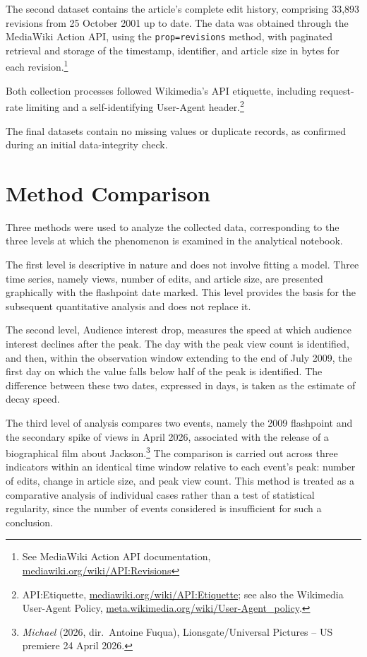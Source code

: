 \documentclass[11pt]{article}
\begin{document}
The second dataset contains the article's complete edit history, comprising 33{,}893 revisions from 25 October 2001 up to date. The data was obtained through the MediaWiki Action API, using the \texttt{prop=revisions} method, with paginated retrieval and storage of the timestamp, identifier, and article size in bytes for each revision.\footnote{See MediaWiki Action API documentation, \url{mediawiki.org/wiki/API:Revisions}}

Both collection processes followed Wikimedia's API etiquette, including request-rate limiting and a self-identifying User-Agent header.\footnote{API:Etiquette, \url{mediawiki.org/wiki/API:Etiquette}; see also the Wikimedia User-Agent Policy, \url{meta.wikimedia.org/wiki/User-Agent_policy}.}

The final datasets contain no missing values or duplicate records, as confirmed during an initial data-integrity check.


\section*{Method Comparison}

Three methods were used to analyze the collected data, corresponding to the three levels at which the phenomenon is examined in the analytical notebook.

The first level is descriptive in nature and does not involve fitting a model. Three time series, namely views, number of edits, and article size, are presented graphically with the flashpoint date marked. This level provides the basis for the subsequent quantitative analysis and does not replace it.

The second level, Audience interest drop, measures the speed at which audience interest declines after the peak. The day with the peak view count is identified, and then, within the observation window extending to the end of July 2009, the first day on which the value falls below half of the peak is identified. The difference between these two dates, expressed in days, is taken as the estimate of decay speed.

The third level of analysis compares two events, namely the 2009 flashpoint and the secondary spike of views in April 2026, associated with the release of a biographical film about Jackson.\footnote{\textit{Michael} (2026, dir.\ Antoine Fuqua), Lionsgate/Universal Pictures -- US premiere 24 April 2026.} The comparison is carried out across three indicators within an identical time window relative to each event's peak: number of edits, change in article size, and peak view count. This method is treated as a comparative analysis of individual cases rather than a test of statistical regularity, since the number of events considered is insufficient for such a conclusion.
\end{document}
